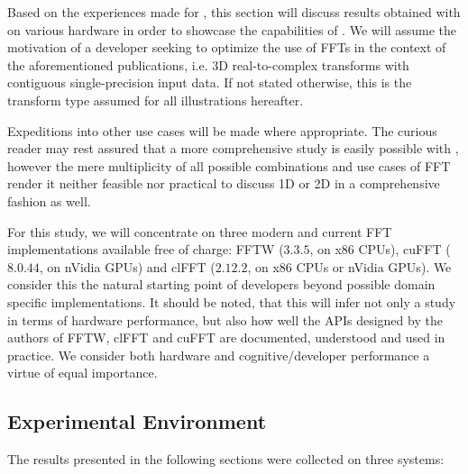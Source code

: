 Based on the experiences made for \cite{preibisch2014efficient, schmid2015real}, this section will discuss results obtained with \gearshifft{} on various hardware in order to showcase the capabilities of \gearshifft{}. We will assume the motivation of a developer seeking to optimize the use of FFTs in the context of the aforementioned publications, i.e. 3D real-to-complex transforms with contiguous single-precision input data. If not stated otherwise, this is the transform type assumed for all illustrations hereafter. 

Expeditions into other use cases will be made where appropriate. The curious reader may rest assured that a more comprehensive study is easily possible with \gearshifft{}, however the mere multiplicity of all possible combinations and use cases of FFT render it neither feasible nor practical to discuss 1D or 2D in a comprehensive fashion as well.

For this study, we will concentrate on three modern and current FFT implementations available free of charge: FFTW ($3.3.5$, on x86 CPUs), cuFFT ($8.0.44$, on nVidia GPUs) and clFFT ($2.12.2$, on x86 CPUs or nVidia GPUs). We consider this the natural starting point of developers beyond possible domain specific implementations. It should be noted, that this will infer not only a study in terms of hardware performance, but also how well the APIs designed by the authors of FFTW, clFFT and cuFFT are documented, understood and used in practice. We consider both hardware and cognitive/developer performance a virtue of equal importance.

\subsection{Experimental Environment}
\label{ssec:env}

The results presented in the following sections were collected on three systems:

